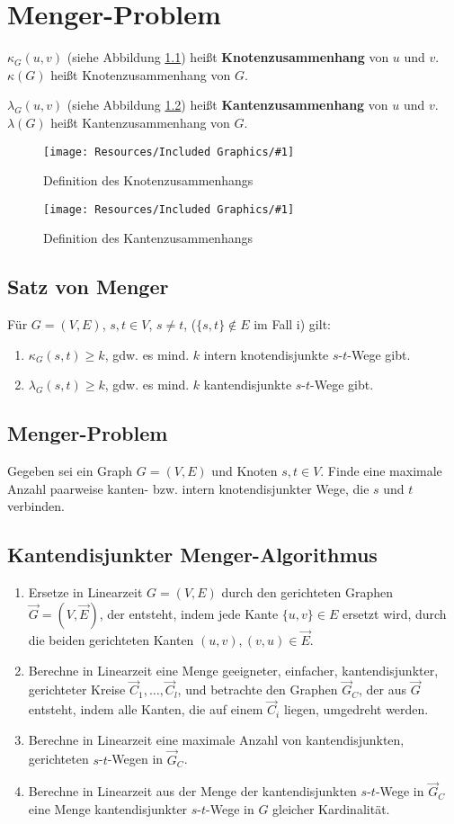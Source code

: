 \documentclass[a4paper,11pt]{report}
\newcommand{\fig}[2]{
    \begin{figure}[h]
        \begin{center}
            \texttt{[image: Resources/Included Graphics/\#1]}
            \caption{#1}
            \label{fig:#1}
        \end{center}
    \end{figure}
}
\begin{document}
\chapter{Menger-Problem}
$\kappa_G(u, v)$ (siehe Abbildung \ref{fig:Definition des Knotenzusammenhangs}) heißt \textbf{Knotenzusammenhang} von $u$ und $v$.\\
$\kappa(G)$ heißt Knotenzusammenhang von $G$.

$\lambda_G(u, v)$ (siehe Abbildung \ref{fig:Definition des Kantenzusammenhangs}) heißt \textbf{Kantenzusammenhang} von $u$ und $v$.\\
$\lambda(G)$ heißt Kantenzusammenhang von $G$.

\fig{Definition des Knotenzusammenhangs}{.6}
\fig{Definition des Kantenzusammenhangs}{.5}


\section{Satz von Menger}
Für $G = (V, E)$, $s, t \in V$, $s \neq t$, ($\{s, t\} \not \in E$ im Fall i) gilt:

\begin{enumerate}
    \item $\kappa_G(s, t) \geq k$, gdw. es mind. $k$ intern knotendisjunkte $s$-$t$-Wege gibt.
    \item $\lambda_G(s, t) \geq k$, gdw. es mind. $k$ kantendisjunkte $s$-$t$-Wege gibt.
\end{enumerate}

\section{Menger-Problem}
Gegeben sei ein Graph $G = (V, E)$ und Knoten $s, t \in V$. Finde eine maximale Anzahl paarweise kanten- bzw. intern knotendisjunkter Wege, die $s$ und $t$ verbinden.


\section{Kantendisjunkter Menger-Algorithmus}
\begin{enumerate}
    \item Ersetze in Linearzeit $G = (V, E)$ durch den gerichteten Graphen $\vec G = (V, \vec E)$, der entsteht, indem jede Kante $\{u, v\} \in E$ ersetzt wird, durch die beiden gerichteten Kanten $(u, v), (v, u) \in \vec E$.
    \item Berechne in Linearzeit eine Menge geeigneter, einfacher, kantendisjunkter, gerichteter Kreise $\vec C_1, \ldots, \vec C_l$, und betrachte den Graphen $\vec G_C$, der aus $\vec G$ entsteht, indem alle Kanten, die auf einem $\vec C_i$ liegen, umgedreht werden.
    \item Berechne in Linearzeit eine maximale Anzahl von kantendisjunkten, gerichteten $s$-$t$-Wegen in $\vec G_C$.
    \item Berechne in Linearzeit aus der Menge der kantendisjunkten $s$-$t$-Wege in $\vec G_C$ eine Menge kantendisjunkter $s$-$t$-Wege in $G$ gleicher Kardinalität.
\end{enumerate}
\end{document}
